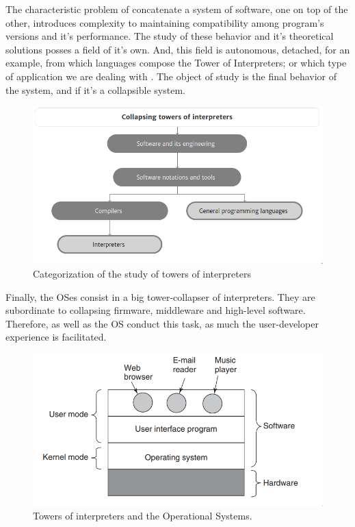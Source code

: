 \documentclass[
12pt,				%
openright,			%
oneside,			%
a4paper,			%
brazil,				%
english,			%
]{abntex2}
\begin{document}
The characteristic problem of concatenate a system of software, one on
top of the other, introduces complexity to maintaining compatibility
among program's versions and it's performance. The study of these
behavior and it's theoretical solutions posses a field of it's
own. And, this field is autonomous, detached, for an example, from
which languages compose the Tower of Interpreters; or which type of
application we are dealing with \cite{amin2017towers}. The object of
study is the final behavior of the system, and if it's a collapsible system. 

\begin{figure}[ht]
  \centering
 \caption{\label{fig:tower2} Categorization of the study of towers of interpreters}
  \includegraphics[width=0.5\linewidth]{torres2.png}
\end{figure}

Finally, the OSes consist in a big tower-collapser of
interpreters. They are subordinate to collapsing firmware, middleware
and high-level software. Therefore, as well as the OS conduct this task,
as much the user-developer experience is facilitated.

\begin{figure}[ht]
  \centering
 \caption{\label{fig:os} Towers of interpreters and the Operational Systems.}
  \includegraphics[width=0.5\linewidth]{tower-os.png}
\end{figure}
\end{document}
